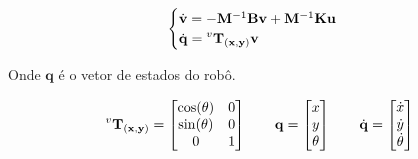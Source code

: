 \begin{equation}
\begin{cases}
\dot{\mathbf{v}} = -\mathbf{M}^{-1} \mathbf{B} \mathbf{v} + \mathbf{M}^{-1} \mathbf{K} \mathbf{u} \\
\dot{\mathbf{q}} = \mathbf{\prescript{v}{}{T_{(x, y)}}} \mathbf{v}
\end{cases}
\end{equation}

Onde $\mathbf{q}$ é o vetor de estados do robô.

\[
\mathbf{\prescript{v}{}{T_{(x, y)}}} =
\begin{bmatrix}
\cos(\theta) & 0 \\
\sin(\theta) & 0 \\
0 & 1
\end{bmatrix}
\qquad
\mathbf{q} =
\begin{bmatrix}
x \\
y \\
\theta
\end{bmatrix}
\qquad
\dot{\mathbf{q}} =
\begin{bmatrix}
\dot{x} \\
\dot{y} \\
\dot{\theta}
\end{bmatrix}
\]
